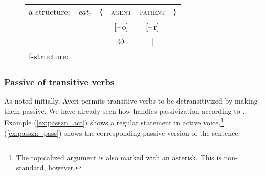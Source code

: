 \begin{figure}[ht]
\ex\label{ex:engpassive}
\begin{tabular}[t]{l >{\itshape}l l c c r}
a-structure:
	& eat₂
	& ⟨
	& \textsc{agent}
	& \textsc{patient}
	& ⟩
	\\
%
	& %
	& %
	& [–\,o]
	& [–\,r]
	& %
	\\

%
	& %
	& %
	& Ø
	& |
	& %
	\\

f-structure:
	& %
	& %
	& %
	& \Subj
	& %
	\\
\end{tabular}
\xe
\end{figure}

\subsubsection{Passive of transitive verbs}

As noted initially, Ayeri permits transitive verbs to be detransitivized by
making them passive. We have already seen how \Lfg{} handles passivization
according to \citet{bresnan2016}. Example (\ref{ex:passzn_act}) shows a regular
statement in active voice,\footnote{The topicalized argument is also marked
with an asterisk. This is non-standard, however.} (\ref{ex:passzn_pass}) shows
the corresponding passive version of the sentence.

